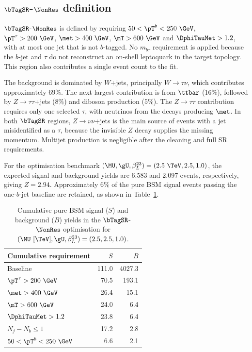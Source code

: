 \clearpage
\subsection[SR1b-NonRes definition]{$\bTagSR$-$\NonRes$ definition}
\label{subsec:ch7_sr1b_nonres}

$\bTagSR$-$\NonRes$ is defined by requiring $50<\pT^b<250~\GeV$, $\pT^\tau>200~\GeV$, $\met>400~\GeV$, $\mT>600~\GeV$ and $\DphiTauMet>1.2$, with at most one jet that is not $b$-tagged.
No $m_{b\tau}$ requirement is applied because the $b$-jet and $\tau$ do not reconstruct an on-shell leptoquark in the target topology.
This region also contributes a single event count to the fit.

The background is dominated by $W$+jets, principally $W\to\tau\nu$, which contributes approximately $69\%$.
The next-largest contribution is from $\ttbar$ ($16\%$), followed by $Z\to\tau\tau$+jets ($8\%$) and diboson production ($5\%$).
The $Z\to\tau\tau$ contribution requires only one selected $\tau$, with neutrinos from the decays producing $\met$.
In both $\bTagSR$ regions, $Z\to\nu\nu$+jets is the main source of events with a jet misidentified as a $\tau$, because the invisible $Z$ decay supplies the missing momentum.
Multijet production is negligible after the cleaning and full SR requirements.

For the optimisation benchmark $(\MU,\gU,\beta_L^{23})=(2.5~\TeV,2.5,1.0)$, the expected signal and background yields are 6.583 and 2.097 events, respectively, giving $Z=2.94$.
Approximately $6\%$ of the pure BSM signal events passing the one-$b$-jet baseline are retained, as shown in Table~\ref{tab:ch7_cutflow_nonres}.

\begin{table}[htbp]
    \centering
    \small
    \caption{Cumulative pure BSM signal ($S$) and background ($B$) yields in the $\bTagSR$-$\NonRes$ optimisation for $(\MU~[\TeV],\gU,\beta_L^{23})=(2.5,2.5,1.0)$.}
    \label{tab:ch7_cutflow_nonres}
    \begin{tabular}{lrr}
        \toprule
        Cumulative requirement & $S$ & $B$ \\
        \midrule
        Baseline & 111.0 & 4027.3 \\
        $\pT^\tau>200~\GeV$ & 70.5 & 193.1 \\
        $\met>400~\GeV$ & 26.4 & 15.1 \\
        $\mT>600~\GeV$ & 24.0 & 6.4 \\
        $\DphiTauMet>1.2$ & 23.8 & 6.4 \\
        $N_j-N_b\leq1$ & 17.2 & 2.8 \\
        $50<\pT^b<250~\GeV$ & 6.6 & 2.1 \\
        \bottomrule
    \end{tabular}
\end{table}

